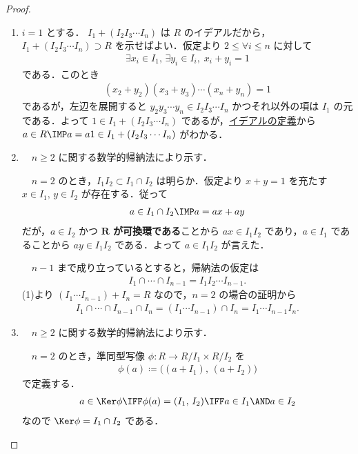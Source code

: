 \documentclass[geometry_main]{subfiles}
\begin{document}
\begin{proof}
	\begin{enumerate}
		\item $i=1$ とする．
		$I_1 + (I_2I_3 \cdots I_n)$ は $R$ のイデアルだから，$I_1 + (I_2I_3 \cdots I_n) \supset R$ を示せばよい．仮定より $2 \le \forall i \le n$ に対して
		\begin{align}
			\exists x_i \in I_1,\, \exists y_i \in I_i,\; x_i + y_i = 1
		\end{align}
		である．このとき
		\begin{align}
			(x_2+y_2)(x_3+y_3) \cdots (x_n+y_n) = 1
		\end{align}
		であるが，左辺を展開すると $y_2y_3 \cdots y_n \in I_2I_3\cdots I_n$ かつそれ以外の項は $I_1$ の元である．よって $1 \in  I_1 + (I_2I_3 \cdots I_n)$ であるが，\hyperref[def:ideal]{イデアルの定義}から $a \in R \IMP a=a1 \in I_1 + (I_2I_3 \cdots I_n)$ がわかる．
		\item 　$n \ge 2$ に関する数学的帰納法により示す．
		
		　$n=2$ のとき，$I_1I_2 \subset I_1 \cap I_2$ は明らか．仮定より $x + y = 1$ を充たす $x \in I_1,\, y \in I_2$ が存在する．従って
		\begin{align}
			a \in I_1\cap I_2 \IMP a = ax+ay
		\end{align}
		だが，$a \in I_2$ かつ \textbf{$\bm{R}$ が可換環である}ことから $ax \in I_1I_2$ であり，$a \in I_1$ であることから $ay \in I_1I_2$ である．よって $a \in I_1I_2$ が言えた． 

		　$n-1$ まで成り立っているとすると，帰納法の仮定は
		\begin{align}
			I_1 \cap \cdots \cap I_{n-1} = I_1I_2 \cdots I_{n-1}.
		\end{align}
		(1)より $(I_1 \cdots I_{n-1}) + I_n = R$ なので，$n=2$ の場合の証明から
		\begin{align}
			I_1 \cap \cdots \cap I_{n-1} \cap I_n = (I_1 \cdots I_{n-1}) \cap I_n = I_1 \cdots I_{n-1} I_n.
		\end{align}
		\item 　$n \ge 2$ に関する数学的帰納法により示す．
		
		　$n=2$ のとき，準同型写像 $\phi \colon R \to R/I_1 \times R/I_2$ を
		\begin{align}
			\phi(a) \coloneqq \bigl( (a + I_1),\, (a + I_2) \bigr)
		\end{align}
		で定義する．
		\begin{align}
			a \in \Ker \phi \IFF \phi(a) = (I_1,\, I_2) \IFF a \in I_1 \AND a \in I_2
		\end{align}
		なので $\Ker \phi = I_1 \cap I_2$ である．
		

\end{enumerate}
\end{proof}
\end{document}
